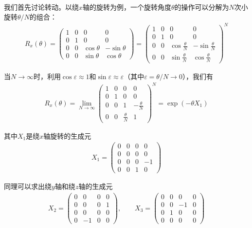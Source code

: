 我们首先讨论转动。以绕$x$轴的旋转为例，一个旋转角度$\theta$的操作可以分解为$N$次小旋转$\theta/N$的组合：
\begin{align*}
    R_x(\theta) = \begin{pmatrix}
        1&0&0&0\\
        0&1&0&0\\
        0&0&\cos\theta&-\sin\theta\\
        0&0&\sin\theta&\cos\theta
    \end{pmatrix}
    = \begin{pmatrix}
        1&0&0&0\\
        0&1&0&0\\
        0&0&\cos\frac{\theta}{N}&-\sin\frac{\theta}{N}\\
        0&0&\sin\frac{\theta}{N}&\cos\frac{\theta}{N}
    \end{pmatrix}^N
\end{align*}

当$N\to\infty$时，利用$\cos\varepsilon \approx 1$和$\sin\varepsilon \approx \varepsilon$（其中$\varepsilon = \theta/N \to 0$），我们有
\begin{align*}
    R_x(\theta) = \lim_{N\to\infty}
    \begin{pmatrix}
        1&0&0&0\\
        0&1&0&0\\
        0&0&1&-\frac{\theta}{N}\\
        0&0&\frac{\theta}{N}&1
    \end{pmatrix}^N
    = \exp\left(-\theta X_1\right)
\end{align*}

其中$X_1$是绕$x$轴旋转的生成元
\begin{align*}
    X_1 =
    \begin{pmatrix}
        0&0&0&0\\
        0&0&0&0\\
        0&0&0&-1\\
        0&0&1&0
    \end{pmatrix}
\end{align*}

同理可以求出绕$y$轴和绕$z$轴的生成元
\begin{align*}
    X_2 =
    \begin{pmatrix}
        0&0&0&0\\
        0&0&0&1\\
        0&0&0&0\\
        0&-1&0&0  
    \end{pmatrix}, \qquad
    X_3 =
    \begin{pmatrix}
        0&0&0&0\\
        0&0&-1&0\\
        0&1&0&0\\
        0&0&0&0   
    \end{pmatrix}
\end{align*}

